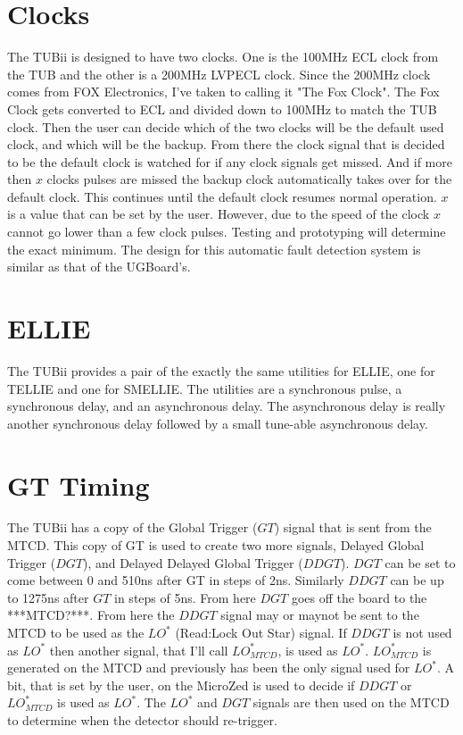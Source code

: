 \documentclass[11pt,a4paper]{article}
\begin{document}
\section{Clocks}
The TUBii is designed to have two clocks. One is the 100MHz ECL clock from the TUB and the other is a 200MHz LVPECL clock. Since the 200MHz clock comes from FOX Electronics, I've taken to calling it "The Fox Clock". The Fox Clock gets converted to ECL and divided down to 100MHz to match the TUB clock. Then the user can decide which of the two clocks will be the default used clock, and which will be the backup. From there the clock signal that is decided to be the default clock is watched for if any clock signals get missed. And if more then $x$ clocks pulses are missed the backup clock automatically takes over for the default clock. This continues until the default clock resumes normal operation. $x$ is a value that can be set by the user. However, due to the speed of the clock $x$ cannot go lower than a few clock pulses. Testing and prototyping will determine the exact minimum. The design for this automatic fault detection system is similar as that of the UGBoard's.
\section{ELLIE}
The TUBii provides a pair of the exactly the same utilities for ELLIE, one for TELLIE and one for SMELLIE.
The utilities are a synchronous pulse, a synchronous delay, and an asynchronous delay.    The asynchronous delay is really another synchronous delay followed by a small tune-able asynchronous delay. 
\section{GT Timing}
\label{GTTiming}
The TUBii has a copy of the Global Trigger ($GT$) signal that is sent from the MTCD. This copy of GT is used to create two more signals, Delayed Global Trigger ($DGT$), and Delayed Delayed Global Trigger ($DDGT$). $DGT$ can be set to come between 0 and 510ns after GT in steps of 2ns. Similarly $DDGT$ can be up to 1275ns after $GT$ in steps of 5ns. From here $DGT$ goes off the board to the ***MTCD?***.  From here the $DDGT$ signal may or maynot be sent to the MTCD to be used as the $LO^*$ (Read:Lock Out Star) signal. If $DDGT$ is not used as $LO^*$ then another signal, that I'll call $LO^*_{MTCD}$, is used as $LO^*$. $LO^*_{MTCD}$ is generated on the MTCD and previously has been the only signal used for $LO^*$. A bit, that is set by the user, on the MicroZed is used to decide if $DDGT$ or $LO^*_{MTCD}$ is used as $LO^*$. 
The $LO^*$ and $DGT$ signals are then used on the MTCD to determine when the detector should re-trigger.
 
\end{document}
